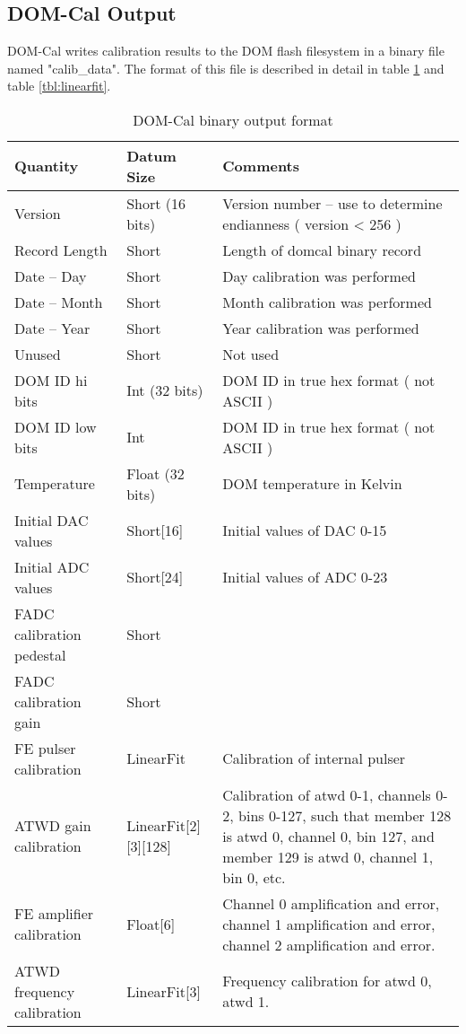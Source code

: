 \documentclass[10pt]{article}
\begin{document}
\subsection{DOM-Cal Output}

DOM-Cal writes calibration results to the DOM flash filesystem in a binary
file named "calib\_data".  The format of this file is described in detail in
table \ref{tbl:binary} and table \ref{tbl:linearfit}.

\begin{table}
\begin{tabular}{|p{4cm}|p{4cm}|p{4cm}|}
\hline
Quantity & Datum Size & Comments \\
\hline
Version & Short (16 bits) & Version number -- use to determine endianness ( version < 256 ) \\
\hline
Record Length & Short & Length of domcal binary record \\
\hline
Date -- Day & Short & Day calibration was performed \\
\hline
Date -- Month & Short & Month calibration was performed \\
\hline
Date -- Year & Short & Year calibration was performed \\
\hline
Unused & Short & Not used \\
\hline
DOM ID hi bits & Int (32 bits) & DOM ID in true hex format ( not ASCII ) \\
\hline
DOM ID low bits & Int & DOM ID in true hex format ( not ASCII ) \\
\hline
Temperature & Float (32 bits) & DOM temperature in Kelvin \\
\hline
Initial DAC values & Short[16] & Initial values of DAC 0-15 \\
\hline
Initial ADC values & Short[24] & Initial values of ADC 0-23 \\
\hline
FADC calibration pedestal & Short & \\
\hline
FADC calibration gain & Short & \\
\hline
FE pulser calibration & LinearFit & Calibration of internal pulser \\
\hline
ATWD gain calibration & LinearFit[2][3][128] & Calibration of atwd 0-1, channels 0-2, bins 0-127,
such that member 128 is atwd 0, channel 0, bin 127,
and member 129 is atwd 0, channel 1, bin 0, etc. \\
\hline
FE amplifier calibration & Float[6] & Channel 0 amplification and error,
channel 1 amplification and error, channel 2 amplification and error. \\
\hline
ATWD frequency calibration & LinearFit[3] & Frequency calibration for atwd 0, atwd 1. \\
\hline
\end{tabular}
\caption{DOM-Cal binary output format}
\label{tbl:binary}
\end{table}
\end{document}
